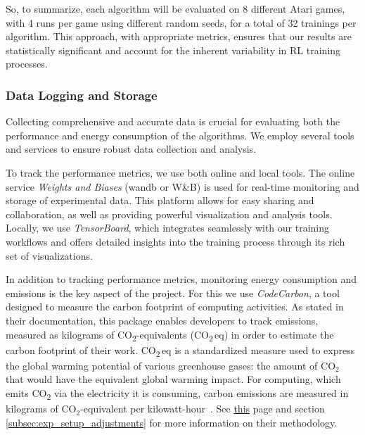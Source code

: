 So, to summarize, each algorithm will be evaluated on 8 different Atari games, with 4 runs per game using different random seeds, for a total of 32 trainings per algorithm. This approach, with appropriate metrics, ensures that our results are statistically significant and account for the inherent variability in RL training processes.

\subsubsection{Data Logging and Storage}
\label{subsubsec:data_collection}

Collecting comprehensive and accurate data is crucial for evaluating both the performance and energy consumption of the algorithms. We employ several tools and services to ensure robust data collection and analysis.

To track the performance metrics, we use both online and local tools. The online service \textit{Weights and Biases} (wandb or W\&B) is used for real-time monitoring and storage of experimental data. This platform allows for easy sharing and collaboration, as well as providing powerful visualization and analysis tools. Locally, we use \textit{TensorBoard}, which integrates seamlessly with our training workflows and offers detailed insights into the training process through its rich set of visualizations.

In addition to tracking performance metrics, monitoring energy consumption and emissions is the key aspect of the project. For this we use \textit{CodeCarbon}, a tool designed to measure the carbon footprint of computing activities. As stated in their documentation, this package enables developers to track emissions, measured as kilograms of \mbox{CO\textsubscript{2}-equivalents} (CO\textsubscript{2}\,eq) in order to estimate the carbon footprint of their work. \mbox{CO\textsubscript{2}\,eq} is a standardized measure used to express the global warming potential of various greenhouse gases: the amount of $\text{CO}_2$ that would have the equivalent global warming impact. For computing, which emits CO\textsubscript{2} via the electricity it is consuming, carbon emissions are measured in kilograms of $\text{CO}_2$-equivalent per kilowatt-hour~\cite{benoit:code_carbon}. See \href{https://mlco2.github.io/codecarbon/methodology.html}{this} page and section \ref{subsec:exp_setup_adjustments} for more information on their methodology.

